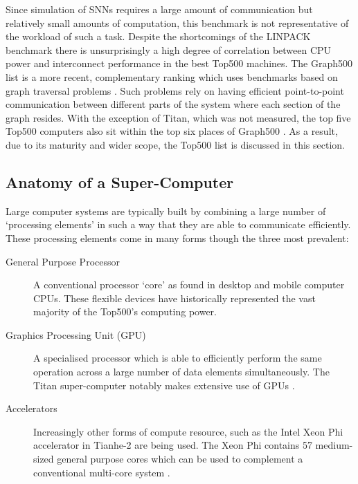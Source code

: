 		Since simulation of SNNs requires a large amount of communication but
		relatively small amounts of computation, this benchmark is not
		representative of the workload of such a task. Despite the shortcomings of
		the LINPACK benchmark there is unsurprisingly a high degree of correlation
		between CPU power and interconnect performance in the best Top500 machines.
		The Graph500 list is a more recent, complementary ranking which uses
		benchmarks based on graph traversal problems \cite{murphy10}. Such problems
		rely on having efficient point-to-point communication between different
		parts of the system where each section of the graph resides. With the
		exception of Titan, which was not measured, the top five Top500 computers
		also sit within the top six places of Graph500 \cite{murphy13n}. As a
		result, due to its maturity and wider scope, the Top500 list is discussed in
		this section.
		
		\subsection{Anatomy of a Super-Computer}
			
			Large computer systems are typically built by combining a large number of
			`processing elements' in such a way that they are able to communicate
			efficiently. These processing elements come in many forms though the three
			most prevalent:
			
			\begin{description}
				
				\item[General Purpose Processor] A conventional processor `core' as
				found in desktop and mobile computer CPUs. These flexible devices have
				historically represented the vast majority of the Top500's computing
				power.
				
				\item[Graphics Processing Unit (GPU)] A specialised processor which is
				able to efficiently perform the same operation across a large number of
				data elements simultaneously. The Titan super-computer notably makes
				extensive use of GPUs \cite{bland12}.
				
				\item[Accelerators] Increasingly other forms of compute resource, such
				as the Intel Xeon Phi accelerator in Tianhe-2 are being used. The Xeon
				Phi contains 57 medium-sized general purpose cores which can be used to
				complement a conventional multi-core system \cite{dongarra13}.
				
			\end{description}
			
